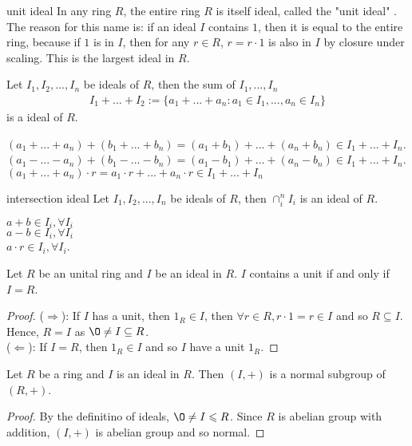 \begin{example}{}{unit ideal}
    In any ring $R$, the entire ring $R$ is itself ideal, called the "unit ideal" . The reason for this name
is: if an ideal $I$ contains $1$, then it is equal to the entire ring, because if $1$ is in $I$, then for any $r\in R$,
$r = r \cdot 1$ is also in $I$ by closure under scaling. This is the largest ideal in $R$.
\end{example}

\begin{example}{}{}
    Let $I_1,I_2,...,I_n$ be ideals of $R$, then the sum of $I_1,...,I_n$
    \begin{align*}
        I_1+...+I_2:=\{a_1+...+a_n:a_1\in I_1,...,a_n\in I_n\}
    \end{align*}
    is a ideal of $R$.
\end{example}

\noindent$(a_1+...+a_n)+(b_1+...+b_n)=(a_1+b_1)+...+(a_n+b_n)\in I_1+...+I_n$.\\
$(a_1-...-a_n)+(b_1-...-b_n)=(a_1-b_1)+...+(a_n-b_n)\in I_1+...+I_n$.\\
$(a_1+...+a_n)\cdot r=a_1\cdot r +... +a_n\cdot r\in I_1+...+I_n$

\begin{example}{}{intersection ideal}
    Let $I_1,I_2,...,I_n$ be ideals of $R$, then $\cap_{i}^{n}I_i$
    is an ideal of $R$.
\end{example}

\noindent$a+b\in I_i, \forall I_i$\\
$a-b\in I_i, \forall I_i$\\
$a\cdot r\in I_i,\forall I_i$.

\begin{proposition}{}{}
    Let $R$ be an unital ring and $I$ be an ideal in $R$. $I$ contains a unit if and only if $I = R$.
\end{proposition}
\begin{proof}
    ($\Rightarrow$): If $I$ has a unit, then $1_R\in I$, then $\forall r\in R,r\cdot 1=r\in I$ and so $R\subseteq I$. Hence, $R=I$ as $\O\neq I\subseteq R$.\\
    ($\Leftarrow$): If $I=R$, then $1_R\in I$ and so $I$ have a unit $1_R$.
\end{proof}

\begin{proposition}{}{}
    Let $R$ be a ring and $I$ is an ideal in $R$. Then $(I,+)$ is a normal subgroup of $(R,+)$.
\end{proposition}
\begin{proof}
    By the definitino of ideals, $\O\neq I\leqs R$. Since $R$ is abelian group with addition, $(I,+)$ is abelian group and so normal.
\end{proof}

